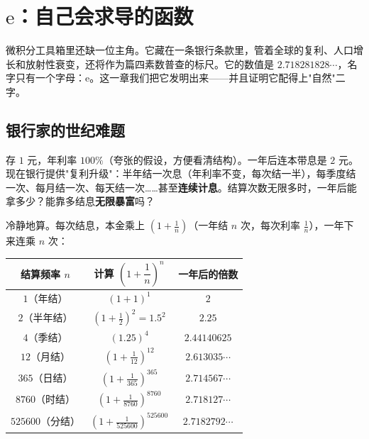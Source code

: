 \chapter{\texorpdfstring{$\mathrm{e}$}{e}：自己会求导的函数}

微积分工具箱里还缺一位主角。它藏在一条银行条款里，管着全球的复利、人口增长和放射性衰变，还将作为篇四素数普查的标尺。它的数值是 $2.718281828\cdots$，名字只有一个字母：$\mathrm{e}$。这一章我们把它发明出来——并且证明它配得上"自然"二字。

\section{银行家的世纪难题}

\begin{kaiwei}
存 $1$ 元，年利率 $100\%$（夸张的假设，方便看清结构）。一年后连本带息是 $2$ 元。现在银行提供"复利升级"：半年结一次息（年利率不变，每次结一半），每季度结一次、每月结一次、每天结一次……甚至\textbf{连续计息}。结算次数无限多时，一年后能拿多少？能靠多结息\textbf{无限暴富}吗？
\end{kaiwei}

冷静地算。每次结息，本金乘上 $\left(1 + \tfrac1n\right)$（一年结 $n$ 次，每次利率 $\tfrac1n$），一年下来连乘 $n$ 次：

\begin{center}
\begin{tabular}{ccc}
\toprule
结算频率 $n$ & 计算 $\left(1+\dfrac1n\right)^n$ & 一年后的倍数 \\
\midrule
$1$（年结） & $(1+1)^1$ & $2$ \\
$2$（半年结） & $(1+\tfrac12)^2 = 1.5^2$ & $2.25$ \\
$4$（季结） & $(1.25)^4$ & $2.44140625$ \\
$12$（月结） & $\left(1+\tfrac1{12}\right)^{12}$ & $2.613035\cdots$ \\
$365$（日结） & $\left(1+\tfrac1{365}\right)^{365}$ & $2.714567\cdots$ \\
$8760$（时结） & $\left(1+\tfrac1{8760}\right)^{8760}$ & $2.718127\cdots$ \\
$525600$（分结） & $\left(1+\tfrac{1}{525600}\right)^{525600}$ & $2.7182792\cdots$ \\
\bottomrule
\end{tabular}
\end{center}

